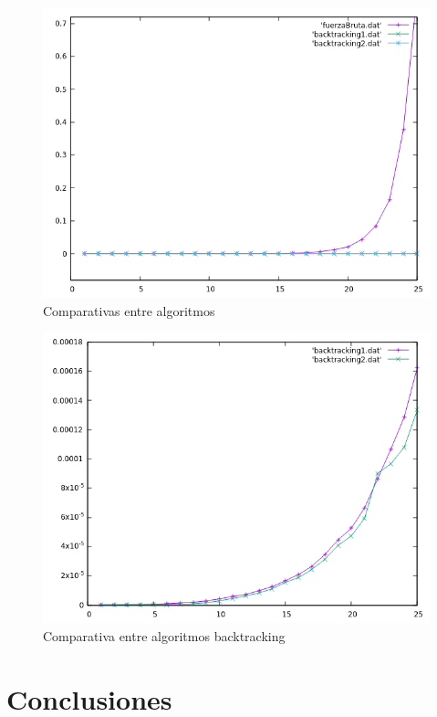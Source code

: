\documentclass[12pt,spanish]{article}
\begin{document}
\begin{figure}[H]
\centering
	\includegraphics[scale=0.75]{todos.png}
	\caption{Comparativas entre algoritmos}
\end{figure}

\begin{figure}[H]
\centering
	\includegraphics[scale=0.75]{ambos_backtracking.png}
	\caption{Comparativa entre algoritmos backtracking}
\end{figure}

\section{Conclusiones}
\end{document}
